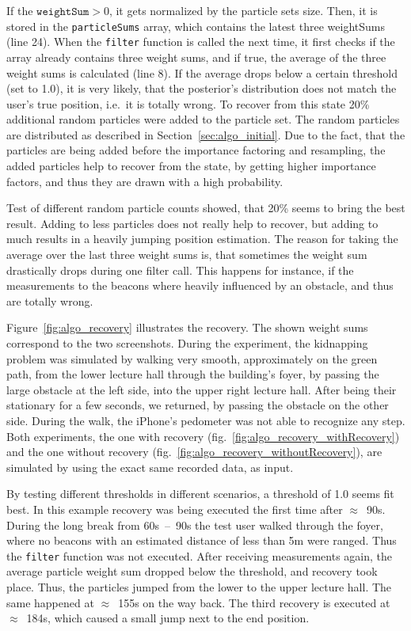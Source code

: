 If the $\texttt{weightSum} > 0$, it gets normalized by the particle sets size. Then, it is stored in the \texttt{particleSums} array, which contains the latest three weightSums (line 24). When the \texttt{filter} function is called the next time, it first checks if the array already contains three weight sums, and if true, the average of the three weight sums is calculated (line 8). If the average drops below a certain threshold (set to 1.0), it is very likely, that the posterior's distribution does not match the user's true position, i.e.\ it is totally wrong. To recover from this state 20\% additional random particles were added to the particle set. The random particles are distributed as described in Section~\ref{sec:algo_initial}. Due to the fact, that the particles are being added before the importance factoring and resampling, the added particles help to recover from the state, by getting higher importance factors, and thus they are drawn with a high probability.

Test of different random particle counts showed, that 20\% seems to bring the best result. Adding to less particles does not really help to recover, but adding to much results in a heavily jumping position estimation. The reason for taking the average over the last three weight sums is, that sometimes the weight sum drastically drops during one filter call. This happens for instance, if the measurements to the beacons where heavily influenced by an obstacle, and thus are totally wrong.

Figure~\ref{fig:algo_recovery} illustrates the recovery. The shown weight sums correspond to the two screenshots. During the experiment, the kidnapping problem was simulated by walking very smooth, approximately on the green path, from the lower lecture hall through the building's foyer, by passing the large obstacle at the left side, into the upper right lecture hall. After being their stationary for a few seconds, we returned, by passing the obstacle on the other side. During the walk, the iPhone's pedometer was not able to recognize any step. Both experiments, the one with recovery (fig.~\ref{fig:algo_recovery_withRecovery}) and the one without recovery (fig.~\ref{fig:algo_recovery_withoutRecovery}), are simulated by using the exact same recorded data, as input.

By testing different thresholds in different scenarios, a threshold of 1.0 seems fit best. In this example recovery was being executed the first time after $\approx$~90s. During the long break from 60s~--~90s the test user walked through the foyer, where no beacons with an estimated distance of less than 5m were ranged. Thus the \texttt{filter} function was not executed. After receiving measurements again, the average particle weight sum dropped below the threshold, and recovery took place. Thus, the particles jumped from the lower to the upper lecture hall. The same happened at $\approx$~155s on the way back. The third recovery is executed at $\approx$~184s, which caused a small jump next to the end position.

